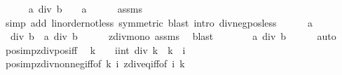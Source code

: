 \begin{isabellebody}
%
\isadelimproof
%
\endisadelimproof
%
\isatagproof
{}\isamarkupfalse%
\isanewline
\ \ \isamarkupfalse%
\ {\isachardoublequoteopen}{}\ {\isasymle}\ a\ div\ b\ {\isasymLongrightarrow}\ {}\ {\isasymle}\ a{\isachardoublequoteclose}\isanewline
\ \ \ \ \isamarkupfalse%
\ assms\isanewline
\ \ \ \ \isamarkupfalse%
\ {\isacharparenleft}{\kern0pt}simp\ add{\isacharcolon}{\kern0pt}\ linorder{\isacharunderscore}{\kern0pt}not{\isacharunderscore}{\kern0pt}less\ {\isacharbrackleft}{\kern0pt}symmetric{\isacharbrackright}{\kern0pt}{\isacharparenright}{\kern0pt}\ {\isacharparenleft}{\kern0pt}blast\ intro{\isacharcolon}{\kern0pt}\ div{\isacharunderscore}{\kern0pt}neg{\isacharunderscore}{\kern0pt}pos{\isacharunderscore}{\kern0pt}less{}{\isacharparenright}{\kern0pt}\isanewline
{}\isamarkupfalse%
\isanewline
\ \ \isamarkupfalse%
\ {\isachardoublequoteopen}{}\ {\isasymle}\ a{\isachardoublequoteclose}\isanewline
\ \ \isamarkupfalse%
\ \isamarkupfalse%
\ {\isachardoublequoteopen}{}\ div\ b\ {\isasymle}\ a\ div\ b{\isachardoublequoteclose}\isanewline
\ \ \ \ \isamarkupfalse%
\ zdiv{\isacharunderscore}{\kern0pt}mono{}\ assms\ \isamarkupfalse%
\ blast\isanewline
\ \ \isamarkupfalse%
\ \isamarkupfalse%
\ {\isachardoublequoteopen}{}\ {\isasymle}\ a\ div\ b{\isachardoublequoteclose}\isanewline
\ \ \ \ \isamarkupfalse%
\ auto\isanewline
{}\isamarkupfalse%
%
\endisatagproof
{\isafoldproof}%
%
\isadelimproof
\isanewline
%
\endisadelimproof
\isanewline
{}\isamarkupfalse%
\ pos{\isacharunderscore}{\kern0pt}imp{\isacharunderscore}{\kern0pt}zdiv{\isacharunderscore}{\kern0pt}pos{\isacharunderscore}{\kern0pt}iff{\isacharcolon}{\kern0pt}\isanewline
\ \ {\isachardoublequoteopen}{}{\isacharless}{\kern0pt}k\ {\isasymLongrightarrow}\ {}\ {\isacharless}{\kern0pt}\ {\isacharparenleft}{\kern0pt}i{\isacharcolon}{\kern0pt}{\isacharcolon}{\kern0pt}int{\isacharparenright}{\kern0pt}\ div\ k\ {\isasymlongleftrightarrow}\ k\ {\isasymle}\ i{\isachardoublequoteclose}\isanewline
%
\isadelimproof
\ \ %
\endisadelimproof
%
\isatagproof
{}\isamarkupfalse%
\ pos{\isacharunderscore}{\kern0pt}imp{\isacharunderscore}{\kern0pt}zdiv{\isacharunderscore}{\kern0pt}nonneg{\isacharunderscore}{\kern0pt}iff{\isacharbrackleft}{\kern0pt}of\ k\ i{\isacharbrackright}{\kern0pt}\ zdiv{\isacharunderscore}{\kern0pt}eq{\isacharunderscore}{\kern0pt}{}{\isacharunderscore}{\kern0pt}iff{\isacharbrackleft}{\kern0pt}of\ i\ k{\isacharbrackright}{\kern0pt}\ \isamarkupfalse%

\end{isabellebody}
